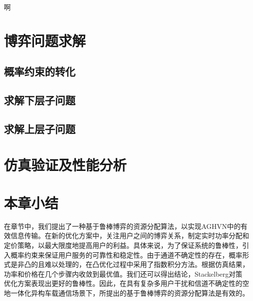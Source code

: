 啊 
\section{博弈问题求解}\label{section2-3}
\subsection{概率约束的转化}\label{section2-3-1}
\subsection{求解下层子问题}\label{section2-3-2}
\subsection{求解上层子问题}\label{section2-3-3}
\section{仿真验证及性能分析}\label{section2-4}

\section{本章小结}\label{section2-5}
在章节中，我们提出了一种基于鲁棒博弈的资源分配算法，以实现AGHVN中的有效信息传输。在新的优化方案中，关注用户之间的博弈关系，制定实时功率分配和定价策略，以最大限度地提高用户的利益。具体来说，为了保证系统的鲁棒性，引入概率约束来保证用户服务的可靠性和稳定性。由于通道不确定性的存在，概率形式是非凸的且难以处理的，在凸优化过程中采用了指数积分方法。根据仿真结果，功率和价格在几个步骤内收敛到最优值。我们还可以得出结论，Stackelberg对策优化方案表现出更好的鲁棒性。因此，在具有复杂多用户干扰和信道不确定性的空地一体化异构车载通信场景下，所提出的基于鲁棒博弈的资源分配算法是有效的。


